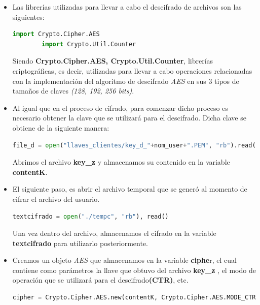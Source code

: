 \begin{itemize}
	\item Las librerías utilizadas para llevar a cabo el descifrado de archivos son las siguientes: 
			
\begin{lstlisting}[language=Python,frame=single, keywordstyle=\color{blue}]
		import Crypto.Cipher.AES
		import Crypto.Util.Counter
\end{lstlisting}

Siendo \textbf{Crypto.Cipher.AES, Crypto.Util.Counter}, librerías criptográficas, es decir, utilizadas para llevar a cabo operaciones relacionadas con la implementación del algoritmo de descifrado \textit{AES} en sus 3 tipos de tamaños de claves \textit{(128, 192, 256 bits)}. 

	\item Al igual que en el proceso de cifrado, para comenzar dicho proceso es necesario obtener la clave que se utilizará para el descifrado. Dicha clave se obtiene de la siguiente manera:  

\begin{lstlisting}[language=Python,frame=single, keywordstyle=\color{blue}]
    file_d = open("llaves_clientes/key_d_"+nom_user+".PEM", "rb").read()

\end{lstlisting}

Abrimos el archivo \textbf{key\_z} y almacenamos su contenido en la variable \textbf{contentK}. 

		\item El siguiente paso, es abrir el archivo temporal que se generó al momento de cifrar el archivo del usuario. 
			
\begin{lstlisting}[language=Python,frame=single, keywordstyle=\color{blue}]
	textcifrado = open("./tempc", "rb"), read()
\end{lstlisting}

Una vez dentro del archivo, almacenamos el cifrado en la variable \textbf{textcifrado} para utilizarlo posteriormente. 

		\item Creamos un objeto \textit{AES} que almacenamos en la variable \textbf{ciphe}r, el cual contiene como parámetros la llave que obtuvo del archivo \textbf{key\_z }, el modo de operación que se utilizará para el descifrado\textbf{(CTR)}, etc.
			
\begin{lstlisting}[language=Python,frame=single, keywordstyle=\color{blue},breaklines=true]
cipher = Crypto.Cipher.AES.new(contentK, Crypto.Cipher.AES.MODE_CTR, counter = ctr)
\end{lstlisting}



\end{itemize}
